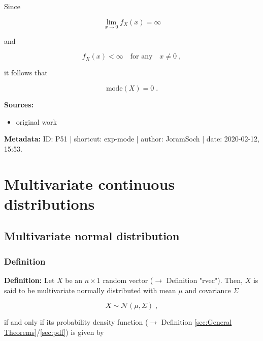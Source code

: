 \documentclass[a4paper,12pt]{book}
\begin{document}
Since

\begin{equation} \label{eq:exp-mode-exp-pdf-eq0}
\lim_{x \to 0} f_X(x) = \infty
\end{equation}

and

\begin{equation} \label{eq:exp-mode-exp-pdf-neq0}
f_X(x) < \infty \quad \text{for any} \quad x \neq 0 \; ,
\end{equation}

it follows that

\begin{equation} \label{eq:exp-mode-exp-mode-qed}
\mathrm{mode}(X) = 0 \; .
\end{equation}

\vspace{1em}
\textbf{Sources:}
\begin{itemize}
\item original work\end{itemize}


\vspace{1em}
\textbf{Metadata:} ID: P51 | shortcut: exp-mode | author: JoramSoch | date: 2020-02-12, 15:53.


\pagebreak
\section{Multivariate continuous distributions}

\subsection{Multivariate normal distribution}

\subsubsection[\textit{Definition}]{Definition} \label{sec:mvn}

\vspace{1em}
\textbf{Definition:} Let $X$ be an $n \times 1$ random vector ($\rightarrow$ Definition "rvec"). Then, $X$ is said to be multivariate normally distributed with mean $\mu$ and covariance $\Sigma$

\begin{equation} \label{eq:mvn-mvn}
X \sim \mathcal{N}(\mu, \Sigma) \; ,
\end{equation}

if and only if its probability density function ($\rightarrow$ Definition \ref{sec:General Theorems}/\ref{sec:pdf}) is given by
\end{document}
